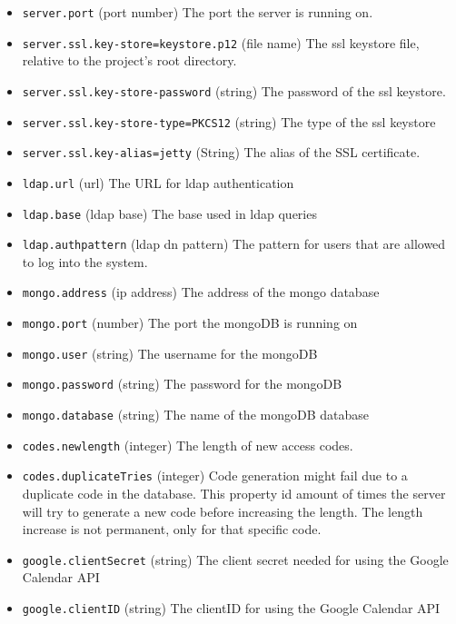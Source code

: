 \begin{itemize}
\item \verb!server.port! (port number) The port the server is running on.
\item \verb!server.ssl.key-store=keystore.p12! (file name) The ssl keystore file, relative to the project's root directory.
\item \verb!server.ssl.key-store-password! (string) The password of the ssl keystore.
\item \verb!server.ssl.key-store-type=PKCS12! (string) The type of the ssl keystore 
\item \verb!server.ssl.key-alias=jetty! (String) The alias of the SSL certificate.

\item \verb!ldap.url! (url) The URL for ldap authentication
\item \verb!ldap.base! (ldap base) The base used in ldap queries
\item \verb!ldap.authpattern! (ldap dn pattern) The pattern for users that are allowed to log into the system. 
\item \verb!mongo.address! (ip address) The address of the mongo database
\item \verb!mongo.port! (number) The port the mongoDB is running on
\item \verb!mongo.user! (string) The username for the mongoDB
\item \verb!mongo.password! (string) The password for the mongoDB
\item \verb!mongo.database! (string) The name of the mongoDB database

\item \verb!codes.newlength! (integer) The length of new access codes.
\item \verb!codes.duplicateTries! (integer) Code generation might fail due to a duplicate code in the database. This property id amount of times the server will try to generate a new code before increasing the length. The length increase is not permanent, only for that specific code.

\item \verb!google.clientSecret! (string) The client secret needed for using the Google Calendar API
\item \verb!google.clientID! (string) The clientID for using the Google Calendar API


\end{itemize}
